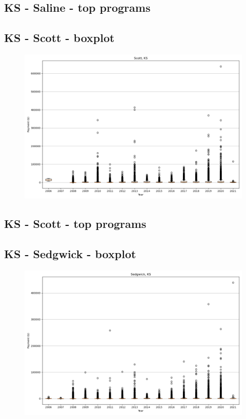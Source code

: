 \subsection*{KS - Saline - top programs}

\newpage
\subsection*{KS - Scott - boxplot}
\begin{figure}[h]
\centering
\includegraphics[width=7in]{../output/boxplots/counties/Scott-KS_boxplot.png}
\end{figure}


\subsection*{KS - Scott - top programs}

\newpage
\subsection*{KS - Sedgwick - boxplot}
\begin{figure}[h]
\centering
\includegraphics[width=7in]{../output/boxplots/counties/Sedgwick-KS_boxplot.png}
\end{figure}


